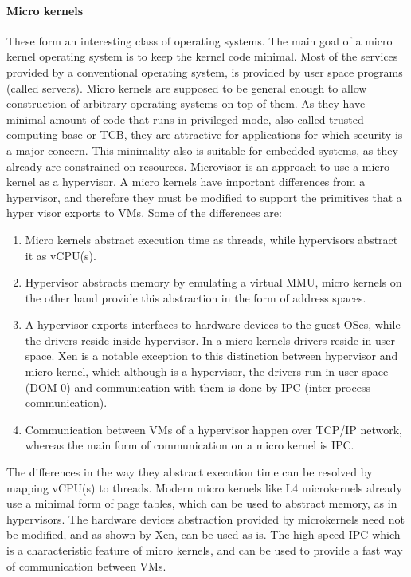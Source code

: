 \documentclass[seminar,twoside]{iitbreport}
\begin{document}
  \paragraph{Micro kernels}
  These form an interesting class of operating systems. The main goal of a micro kernel operating system is to keep the kernel code minimal. Most of the services provided by
  a conventional operating system, is provided by user space programs (called servers). Micro kernels are supposed to be general enough to allow construction of
  arbitrary operating systems on top of them. As they have minimal amount of code that runs in privileged mode, also called trusted computing base or TCB, they are
  attractive for applications for which security is a major concern. This minimality also is suitable for embedded systems, as they already are constrained on
  resources. Microvisor\cite{Heiser:2010:OMC:1851276.1851282} is an approach to use a micro kernel as a hypervisor. A micro kernels have important differences from
  a hypervisor, and therefore they must be modified to support the primitives that a hyper visor exports to VMs.
  Some of the differences are:
  \begin{enumerate}
  \renewcommand{\labelenumi}{(\roman{enumi})}
  \item Micro kernels abstract execution time as threads, while hypervisors abstract it as vCPU(s).
  \item Hypervisor abstracts memory by emulating a virtual MMU, micro kernels on the other hand provide this abstraction in the form of address spaces.
  \item A hypervisor exports interfaces to hardware devices to the guest OSes, while the drivers reside inside hypervisor. In a micro kernels drivers reside in user space. Xen
  is a notable exception to this distinction between hypervisor and micro-kernel, which although is a hypervisor, the drivers run in user space (DOM-0) and communication with them
  is done by IPC (inter-process communication).
  \item Communication between VMs of a hypervisor happen over TCP/IP network, whereas the main form of communication on a micro kernel is IPC.
  \end{enumerate}
  
  The differences in the way they abstract execution time can be resolved by mapping vCPU(s) to threads. Modern micro kernels like L4 microkernels already use a minimal
  form of page tables, which can be used to abstract memory, as in hypervisors. The hardware devices abstraction provided by microkernels need not be modified, and as shown
  by Xen, can be used as is. The high speed IPC which is a characteristic feature of micro kernels, and can be used to provide a fast way of communication between VMs.
  
\end{document}
